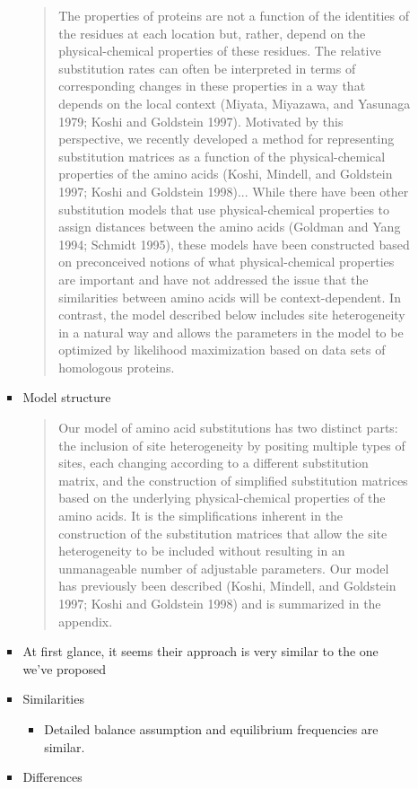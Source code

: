 \begin{itemize}
\begin{itemize}
\begin{itemize}
\begin{quote}
        The properties of proteins are not a function of the identities of the residues at each location but, rather, depend on the physical-chemical properties of these residues. The relative substitution rates can often be interpreted in terms of corresponding changes in these properties in a way that depends on the local context (Miyata, Miyazawa, and Yasunaga 1979; Koshi and Goldstein 1997). Motivated by this perspective, we recently developed a method for representing substitution matrices as a function of the physical-chemical properties of the amino acids (Koshi, Mindell, and Goldstein 1997; Koshi and Goldstein 1998)...  While there have been other substitution models that use physical-chemical properties to assign distances between the amino acids (Goldman and Yang 1994; Schmidt 1995), these models have been constructed based on preconceived notions of what physical-chemical properties are important and have not addressed the issue that the similarities between amino acids will be context-dependent. In contrast, the model described below includes site heterogeneity in a natural way and allows the parameters in the model to be optimized by likelihood maximization based on data sets of homologous proteins.
      \end{quote}
    \item  Model structure
      \begin{quote}
        Our model of amino acid substitutions has two distinct parts: the inclusion of site heterogeneity by positing multiple types of sites, each changing according to a different substitution matrix, and the construction of simplified substitution matrices based on the underlying physical-chemical properties of the amino acids. It is the simplifications inherent in the construction of the substitution matrices that allow the site heterogeneity to be included without resulting in an unmanageable number of adjustable parameters. Our model has previously been described (Koshi, Mindell, and Goldstein 1997; Koshi and Goldstein 1998) and is summarized in the appendix.
      \end{quote}
\item At first glance, it seems their approach is very similar to the one we've proposed
\item Similarities
  \begin{itemize}
  \item Detailed balance assumption and equilibrium frequencies are similar. 
  \end{itemize}
\item Differences

\end{itemize}
\end{itemize}
\end{itemize}
